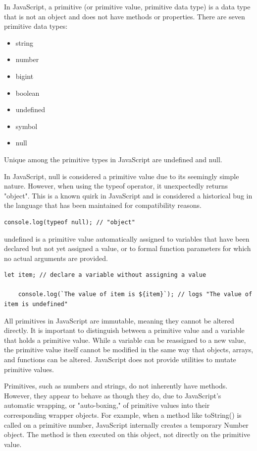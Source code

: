 In JavaScript, a primitive (or primitive value, primitive data type) is a data type that is not an object and does not have methods or properties. There are seven primitive data types:

\begin{itemize}
	\item string
	\item number
	\item bigint
	\item boolean
	\item undefined
	\item symbol
	\item null
\end{itemize}

Unique among the primitive types in JavaScript are undefined and null.

In JavaScript, null is considered a primitive value due to its seemingly simple nature. However, when using the typeof operator, it unexpectedly returns "object". This is a known quirk in JavaScript and is considered a historical bug in the language that has been maintained for compatibility reasons.

\begin{lstlisting}[caption=typeof null return "object" in JavaScript ]
	console.log(typeof null); // "object"
\end{lstlisting}

undefined is a primitive value automatically assigned to variables that have been declared but not yet assigned a value, or to formal function parameters for which no actual arguments are provided.

\begin{lstlisting}[caption=typeof null return "object" in JavaScript ]
	let item; // declare a variable without assigning a value

	console.log(`The value of item is ${item}`); // logs "The value of item is undefined"

\end{lstlisting}

All primitives in JavaScript are immutable, meaning they cannot be altered directly. It is important to distinguish between a primitive value and a variable that holds a primitive value. While a variable can be reassigned to a new value, the primitive value itself cannot be modified in the same way that objects, arrays, and functions can be altered. JavaScript does not provide utilities to mutate primitive values.

Primitives, such as numbers and strings, do not inherently have methods. However, they appear to behave as though they do, due to JavaScript's automatic wrapping, or "auto-boxing," of primitive values into their corresponding wrapper objects. For example, when a method like toString() is called on a primitive number, JavaScript internally creates a temporary Number object. The method is then executed on this object, not directly on the primitive value.

